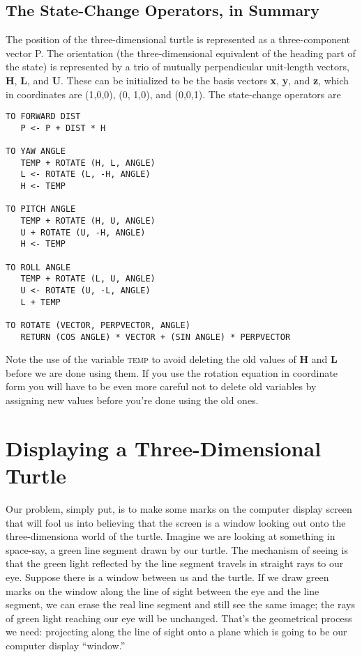 \documentclass{book}
\begin{document}
\subsection{The State-Change Operators, in Summary}

The position of the three-dimensional turtle is represented as a three-component vector P. The orientation (the three-dimensional equivalent
of the heading part of the state) is represented by a trio of mutually
perpendicular unit-length vectors, \textbf{H}, \textbf{L}, and \textbf{U}. These can be initialized
to be the basis vectors \textbf{x}, \textbf{y}, and \textbf{z}, which in coordinates are (1,0,0),
(0, 1,0), and (0,0,1). The state-change operators are

\begin{verbatim}
TO FORWARD DIST
   P <- P + DIST * H

TO YAW ANGLE
   TEMP + ROTATE (H, L, ANGLE)
   L <- ROTATE (L, -H, ANGLE)
   H <- TEMP

TO PITCH ANGLE
   TEMP + ROTATE (H, U, ANGLE)
   U + ROTATE (U, -H, ANGLE)
   H <- TEMP

TO ROLL ANGLE
   TEMP + ROTATE (L, U, ANGLE)
   U <- ROTATE (U, -L, ANGLE)
   L + TEMP

TO ROTATE (VECTOR, PERPVECTOR, ANGLE)
   RETURN (COS ANGLE) * VECTOR + (SIN ANGLE) * PERPVECTOR
\end{verbatim}
Note the use of the variable \textsc{temp} to avoid deleting the old values of \textbf{H}
and \textbf{L} before we are done using them. If you use the rotation equation
in coordinate form you will have to be even more careful not to delete
old variables by assigning new values before you're done using the old
ones.

\section{Displaying a Three-Dimensional Turtle}

Our problem, simply put, is to make some marks on the computer
display screen that will fool us into believing that the screen is a window
looking out onto the three-dimensiona world of the turtle. Imagine we
are looking at something in space-say, a green line segment drawn by
our turtle. The mechanism of seeing is that the green light reflected by
the line segment travels in straight rays to our eye. Suppose there is
a window between us and the turtle. If we draw green marks on the
window along the line of sight between the eye and the line segment, we
can erase the real line segment and still see the same image; the rays of
green light reaching our eye will be unchanged. That's the geometrical
process we need: projecting along the line of sight onto a plane which is
going to be our computer display ``window.''
\end{document}
